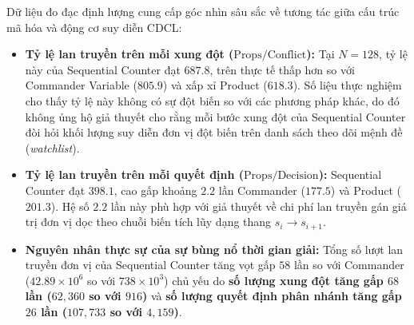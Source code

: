 \documentclass[a4paper,fleqn]{cas-sc}
\begin{document}
\begin{enumerate}
    Dữ liệu đo đạc định lượng cung cấp góc nhìn sâu sắc về tương tác giữa cấu trúc mã hóa và động cơ suy diễn CDCL:
    \begin{itemize}
        \item \textbf{Tỷ lệ lan truyền trên mỗi xung đột ($\text{Props} / \text{Conflict}$):} Tại $N=128$, tỷ lệ này của Sequential Counter đạt $687.8$, trên thực tế thấp hơn so với Commander Variable ($805.9$) và xấp xỉ Product ($618.3$). Số liệu thực nghiệm cho thấy tỷ lệ này không có sự đột biến so với các phương pháp khác, do đó không ủng hộ giả thuyết cho rằng mỗi bước xung đột của Sequential Counter đòi hỏi khối lượng suy diễn đơn vị đột biến trên danh sách theo dõi mệnh đề (\textit{watchlist}).
        \item \textbf{Tỷ lệ lan truyền trên mỗi quyết định ($\text{Props} / \text{Decision}$):} Sequential Counter đạt $398.1$, cao gấp khoảng $2.2$ lần Commander ($177.5$) và Product ($201.3$). Hệ số $2.2$ lần này phù hợp với giả thuyết về chi phí lan truyền gán giá trị đơn vị dọc theo chuỗi biến tích lũy dạng thang $s_i \to s_{i+1}$.
        \item \textbf{Nguyên nhân thực sự của sự bùng nổ thời gian giải:} Tổng số lượt lan truyền đơn vị của Sequential Counter tăng vọt gấp $58$ lần so với Commander ($42.89 \times 10^6$ so với $738 \times 10^3$) chủ yếu do \textbf{số lượng xung đột tăng gấp $68$ lần ($62{,}360$ so với $916$)} và \textbf{số lượng quyết định phân nhánh tăng gấp $26$ lần ($107{,}733$ so với $4{,}159$)}.
    \end{itemize}

\end{enumerate}
\end{document}
